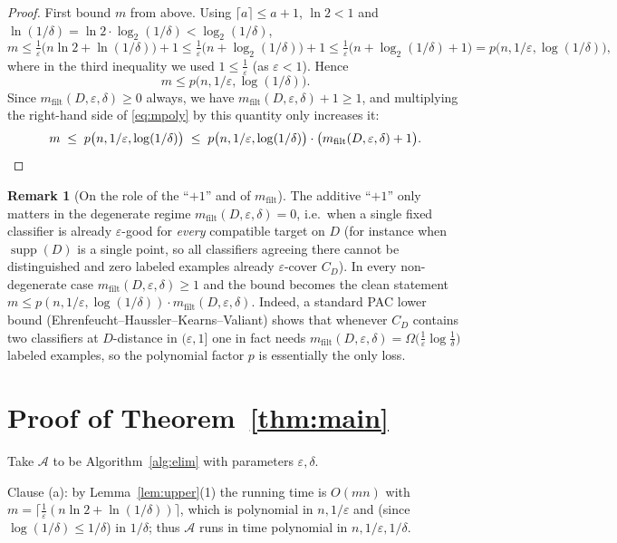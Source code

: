 \documentclass{amsart}
\theoremstyle{definition}
\newtheorem{remark}{Remark}
\DeclareMathOperator{\supp}{supp}
\newcommand{\eps}{\varepsilon}
\begin{document}
\begin{proof}
First bound $m$ from above. Using $\lceil a\rceil\le a+1$, $\ln 2<1$ and
$\ln(1/\delta)=\ln 2\cdot\log_2(1/\delta)<\log_2(1/\delta)$,
\[
  m \le \tfrac1\eps\bigl(n\ln 2+\ln(1/\delta)\bigr)+1
     \le \tfrac1\eps\bigl(n+\log_2(1/\delta)\bigr)+1
     \le \tfrac1\eps\bigl(n+\log_2(1/\delta)+1\bigr)
     = p\bigl(n,1/\eps,\log(1/\delta)\bigr),
\]
where in the third inequality we used $1\le \frac1\eps$ (as $\eps<1$). Hence
\begin{equation}\label{eq:mpoly}
  m \le p\bigl(n,1/\eps,\log(1/\delta)\bigr).
\end{equation}
Since $m_{\mathrm{filt}}(D,\eps,\delta)\ge 0$ always, we have
$m_{\mathrm{filt}}(D,\eps,\delta)+1\ge 1$, and multiplying the right-hand side of
\eqref{eq:mpoly} by this quantity only increases it:
\[
  m \;\le\; p\bigl(n,1/\eps,\log(1/\delta)\bigr)
        \;\le\; p\bigl(n,1/\eps,\log(1/\delta)\bigr)\cdot
                \bigl(m_{\mathrm{filt}}(D,\eps,\delta)+1\bigr).\qedhere
\]
\end{proof}

\begin{remark}[On the role of the ``$+1$'' and of $m_{\mathrm{filt}}$]
The additive ``$+1$'' only matters in the degenerate regime
$m_{\mathrm{filt}}(D,\eps,\delta)=0$, i.e.\ when a single fixed classifier is
already $\eps$-good for \emph{every} compatible target on $D$ (for instance when
$\supp(D)$ is a single point, so all classifiers agreeing there cannot be
distinguished and zero labeled examples already $\eps$-cover $C_D$). In every
non-degenerate case $m_{\mathrm{filt}}(D,\eps,\delta)\ge 1$ and the bound
becomes the clean statement
$m\le p(n,1/\eps,\log(1/\delta))\cdot m_{\mathrm{filt}}(D,\eps,\delta)$.
Indeed, a standard PAC lower bound (Ehrenfeucht--Haussler--Kearns--Valiant)
shows that whenever $C_D$ contains two classifiers at $D$-distance in
$(\eps,1]$ one in fact needs
$m_{\mathrm{filt}}(D,\eps,\delta)=\Omega\bigl(\frac1\eps\log\frac1\delta\bigr)$
labeled examples, so the polynomial factor $p$ is essentially the only loss.
\end{remark}

\section{Proof of Theorem~\ref{thm:main}}

Take $\mathcal A$ to be Algorithm~\ref{alg:elim} with parameters $\eps,\delta$.

Clause (a): by Lemma~\ref{lem:upper}(1) the running time is $O(mn)$ with
$m=\lceil\frac1\eps(n\ln2+\ln(1/\delta))\rceil$, which is polynomial in
$n,1/\eps$ and (since $\log(1/\delta)\le 1/\delta$) in $1/\delta$; thus $\mathcal
A$ runs in time polynomial in $n,1/\eps,1/\delta$.
\end{document}
